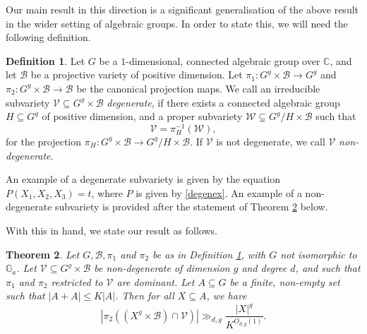 \documentclass[12pt, reqno]{amsart}
\newcommand{\G}{\mathbb{G}}
\newtheorem{theorem}{Theorem}[section]
\theoremstyle{remark}
\theoremstyle{definition}
\newtheorem{definition}[theorem]{Definition}
\numberwithin{equation}{section}
\begin{document}
Our main result in this direction is a significant generalisation of the above result in the wider setting of algebraic groups. In order to state this, we will need the following definition. 



\begin{definition} \label{degenvar}
Let $G$  be a $1$-dimensional, connected algebraic group over $\mathbb{C}$, and let $\mathcal{B}$ be a projective variety of positive dimension. Let $\pi_1 : G^g \times \mathcal{B} \to G^g$ and $\pi_2: G^g \times \mathcal{B} \to \mathcal{B}$ be the canonical projection maps.  We call an irreducible subvariety $\mathcal{V} \subseteq  G^g \times \mathcal{B}$ \emph{degenerate}, if there exists a connected algebraic group $H \subseteq G^g$ of positive dimension, and a proper subvariety $\mathcal{W} \subsetneq G^g/H\times \mathcal{B} $ such that 
$$\mathcal{V} = \pi_H^{-1}(\mathcal{W}), $$
for the projection $\pi_H: G^g \times \mathcal{B} \rightarrow G^g/H\times \mathcal{B}$. 
    If $\mathcal{V}$ is not degenerate, we call $\mathcal{V}$ \textit{non-degenerate}. 
\end{definition} 

An example of a degenerate subvariety is given by the equation $P(X_1, X_2, X_3) = t$, where $P$ is given by \eqref{degenex}. An example of a non-degenerate subvariety is provided after the statement of Theorem \ref{elekesronyai} below.


With this in hand, we state our result as follows.

 \begin{theorem} \label{elekesronyai}
Let $G, \mathcal{B}, \pi_1$ and $\pi_2$ be as in Definition \ref{degenvar}, with $G$ not isomorphic to $\G_a$. Let $\mathcal{V} \subseteq G^g\times \mathcal{B}$ be non-degenerate of dimension $g$ and degree $d$, and such that $\pi_1$ and $\pi_2$ restricted to $\mathcal{V}$ are dominant. Let $A \subseteq G$ be a finite, non-empty set such that $|A+A| \leq K|A|$. Then for all $X \subseteq A$, we have
\begin{equation} \label{elrexp}
    |\pi_2((X^g\times \mathcal{B}) \cap \mathcal{V})| \gg_{d,g} \frac{|X|^g}{K^{O_{d,g}(1)}}.
\end{equation}
 \end{theorem}
\end{document}
